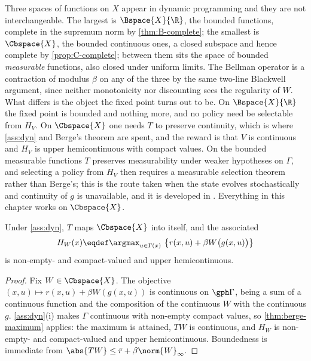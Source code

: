 \begin{remark}\label{rem:dyn-function-space}
	Three spaces of functions on $X$ appear in dynamic programming and they are
	not interchangeable. The largest is $\Bspace{X}{\R}$, the bounded functions,
	complete in the supremum norm by \autoref{thm:B-complete}; the smallest is
	$\Cbspace{X}$, the bounded continuous ones, a closed subspace and hence
	complete by \autoref{prop:C-complete}; between them sits the space of bounded
	\emph{measurable} functions, also closed under uniform limits. The Bellman
	operator is a contraction of modulus $\beta$ on any of the three by the same
	two-line Blackwell argument, since neither monotonicity nor discounting sees
	the regularity of $W$. What differs is the object the fixed point turns out
	to be. On $\Bspace{X}{\R}$ the fixed point is bounded and nothing more, and
	no policy need be selectable from $H_V$. On $\Cbspace{X}$ one needs $T$ to
	preserve continuity, which is where \autoref{ass:dyn} and Berge's theorem are
	spent, and the reward is that $V$ is continuous and $H_V$ is upper
	hemicontinuous with compact values. On the bounded measurable functions $T$
	preserves measurability under weaker hypotheses on $\Gamma$, and selecting a
	policy from $H_V$ then requires a measurable selection theorem rather than
	Berge's; this is the route taken when the state evolves stochastically and
	continuity of $g$ is unavailable, and it is developed in
	\textcite[Ch.~7]{stokey1989recursive}. Everything in this chapter works on
	$\Cbspace{X}$.
\end{remark}

\begin{proposition}\label{prop:bellman-well-defined}
	Under \autoref{ass:dyn}, $T$ maps $\Cbspace{X}$ into itself, and the
	associated 
	\begin{equation}\label{eq:policy-correspondence}
		H_W(x)\eqdef\argmax_{u\in\Gamma(x)}\
		\bigl\{r(x,u)+\beta W\bigl(g(x,u)\bigr)\bigr\}
	\end{equation}
	is non-empty- and compact-valued and upper hemicontinuous.
\end{proposition}

\begin{proof}
	Fix $W\in\Cbspace{X}$. The objective
	$(x,u)\mapsto r(x,u)+\beta W(g(x,u))$ is continuous on $\gph\Gamma$, being a sum
	of a continuous function and the composition of the continuous $W$ with the
	continuous $g$. \autoref{ass:dyn}(i) makes $\Gamma$ continuous with non-empty
	compact values, so \autoref{thm:berge-maximum} applies: the maximum is attained,
	$TW$ is continuous, and $H_W$ is non-empty- and compact-valued and upper
	hemicontinuous. Boundedness is immediate from
	$\abs{TW}\leq\bar r+\beta\norm{W}_\infty$.
\end{proof}

